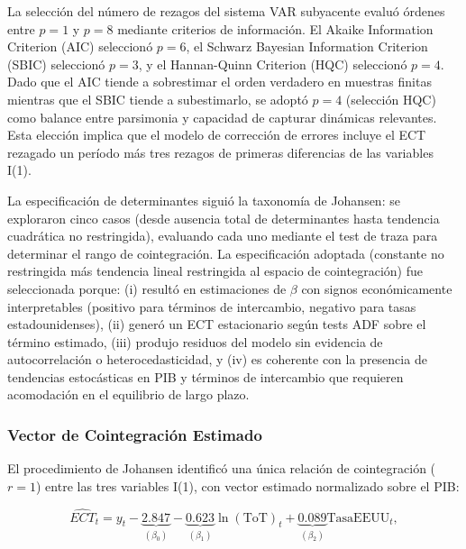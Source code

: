 \documentclass[3p,11pt,draft,natbib=false]{elsarticle}
\begin{document}
La selección del número de rezagos del sistema VAR subyacente evaluó órdenes entre $p=1$ y $p=8$ mediante criterios de información. El Akaike Information Criterion (AIC) seleccionó $p=6$, el Schwarz Bayesian Information Criterion (SBIC) seleccionó $p=3$, y el Hannan-Quinn Criterion (HQC) seleccionó $p=4$. Dado que el AIC tiende a sobrestimar el orden verdadero en muestras finitas mientras que el SBIC tiende a subestimarlo, se adoptó $p=4$ (selección HQC) como balance entre parsimonia y capacidad de capturar dinámicas relevantes. Esta elección implica que el modelo de corrección de errores incluye el ECT rezagado un período más tres rezagos de primeras diferencias de las variables I(1).

La especificación de determinantes siguió la taxonomía de Johansen: se exploraron cinco casos (desde ausencia total de determinantes hasta tendencia cuadrática no restringida), evaluando cada uno mediante el test de traza para determinar el rango de cointegración. La especificación adoptada (constante no restringida más tendencia lineal restringida al espacio de cointegración) fue seleccionada porque: (i) resultó en estimaciones de $\beta$ con signos económicamente interpretables (positivo para términos de intercambio, negativo para tasas estadounidenses), (ii) generó un ECT estacionario según tests ADF sobre el término estimado, (iii) produjo residuos del modelo sin evidencia de autocorrelación o heterocedasticidad, y (iv) es coherente con la presencia de tendencias estocásticas en PIB y términos de intercambio que requieren acomodación en el equilibrio de largo plazo.

\subsubsection{Vector de Cointegración Estimado}

El procedimiento de Johansen identificó una única relación de cointegración ($r=1$) entre las tres variables I(1), con vector estimado normalizado sobre el PIB:

\begin{equation}
\widehat{ECT}_t = y_t - \underbrace{2.847}_{(\beta_0)} - \underbrace{0.623}_{(\beta_1)} \ln(\text{ToT})_t + \underbrace{0.089}_{(\beta_2)} \text{TasaEEUU}_t,
\label{eq:estimated_cointegration}
\end{equation}
\end{document}

